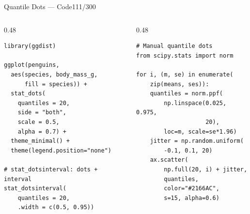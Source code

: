 \documentclass[10pt]{beamer}
\newcommand{\smark}[1]{\hfill{\scriptsize\color{codegray}#1}}
\begin{document}
\begin{frame}[fragile]{Quantile Dots --- Code}\smark{111/300}
\begin{columns}[T]
\begin{column}{0.48\textwidth}
\begin{lstlisting}[style=Rstyle]
library(ggdist)

ggplot(penguins,
  aes(species, body_mass_g,
      fill = species)) +
  stat_dots(
    quantiles = 20,
    side = "both",
    scale = 0.5,
    alpha = 0.7) +
  theme_minimal() +
  theme(legend.position="none")

# stat_dotsinterval: dots + interval
stat_dotsinterval(
    quantiles = 20,
    .width = c(0.5, 0.95))
\end{lstlisting}
\end{column}
\begin{column}{0.48\textwidth}
\begin{lstlisting}[style=Pystyle]
# Manual quantile dots
from scipy.stats import norm

for i, (m, se) in enumerate(
    zip(means, ses)):
    quantiles = norm.ppf(
        np.linspace(0.025, 0.975,
                    20),
        loc=m, scale=se*1.96)
    jitter = np.random.uniform(
        -0.1, 0.1, 20)
    ax.scatter(
        np.full(20, i) + jitter,
        quantiles,
        color="#2166AC",
        s=15, alpha=0.6)
\end{lstlisting}
\end{column}
\end{columns}
\end{frame}
\end{document}
